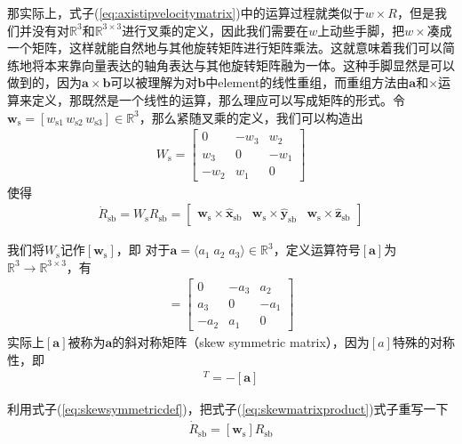 \documentclass[12pt, a4paper, article, UTF8]{ctexart}
\begin{document}
那实际上，式子(\ref{eq:axistipvelocitymatrix})中的运算过程就类似于$w \times R$，但是我们并没有对$\mathbb{R}^3$和$\mathbb{R}^{3\times 3}$进行叉乘的定义，因此我们需要在$w$上动些手脚，把$w\times$凑成一个矩阵，这样就能自然地与其他旋转矩阵进行矩阵乘法。这就意味着我们可以简练地将本来靠向量表达的轴角表达与其他旋转矩阵融为一体。这种手脚显然是可以做到的，因为$\mathbf{a} \times \mathbf{b}$可以被理解为对$\mathbf{b}$中element的线性重组，而重组方法由$\mathbf{a}$和$\times$运算来定义，那既然是一个线性的运算，那么理应可以写成矩阵的形式。令$\mathbf{w}_\text{s} = [w_{\text{s}1} \, w_{\text{s}2} \, w_{\text{s}3}]\in \mathbb{R}^3$，那么紧随叉乘的定义，我们可以构造出
\begin{align}
W_\text{s}=\begin{bmatrix}
0&-w_3&w_2\\
w_3&0&-w_1\\
-w_2&w_1&0
\end{bmatrix}
\end{align}
使得
\begin{align}
\dot{R}_\text{sb} = W_\text{s}R_\text{sb} = \begin{bmatrix}
\mathbf{w}_\text{s} \times \hat{\mathbf{x}}_\text{sb} & \mathbf{w}_\text{s} \times \hat{\mathbf{y}}_\text{sb}& \mathbf{w}_\text{s} \times \hat{\mathbf{z}}_\text{sb} 
\end{bmatrix} \label{eq:skewmatrixproduct}
\end{align}

我们将$W_\text{s}$记作$[\mathbf{w}_\text{s}]$，即
对于$\mathbf{a}=\langle a_1 \; a_2 \;a_3\rangle\in\mathbb{R}^3$，定义运算符号$[\mathbf{a}]$为$\mathbb{R}^3\rightarrow \mathbb{R}^{3\times 3}$，有
\begin{align}
[\mathbf{a}] = \begin{bmatrix}
0 & -a_3 & a_2 \\
a_3 & 0 & -a_1\\
-a_2 & a_1 & 0
\end{bmatrix} \label{eq:skewsymmetricdef}
\end{align} 
实际上$[\mathbf{a}]$被称为$\mathbf{a}$的斜对称矩阵（skew symmetric matrix），因为$[a]$特殊的对称性，即
\begin{align}
[\mathbf{a}]^T = -[\mathbf{a}] \label{eq:skewtransposeproperty}
\end{align}

利用式子(\ref{eq:skewsymmetricdef})，把式子(\ref{eq:skewmatrixproduct})式子重写一下
\begin{align}
\dot{R}_\text{sb} = [\mathbf{w}_\text{s}]R_\text{sb} \label{eq:skewproduct}
\end{align}
\end{document}
